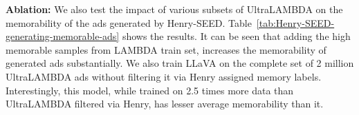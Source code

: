\textbf{Ablation:} We also test the impact of various subsets of UltraLAMBDA on the memorability of the ads generated by Henry-SEED. Table~\ref{tab:Henry-SEED-generating-memorable-ads} shows the results. It can be seen that adding the high memorable samples from LAMBDA train set, increases the memorability of generated ads substantially. We also train LLaVA on the complete set of 2 million UltraLAMBDA ads without filtering it via Henry assigned memory labels. Interestingly, this model, while trained on 2.5 times more data than UltraLAMBDA filtered via Henry, has lesser average memorability than it.




\begin{table}[!h]
    \caption{\textbf{Ad Generation}: Perplexity comparison (refer \S\ref{sec:Perplexity evaluation}) of LLaVA and Henry-SEED on low/medium/high memorable ads from LAMBDA test set. We see that untrained LLaVA does not favor memorable ads. Further, we note that when synthetic data is included during training, the ratio of perplexity on low and high ads grows from 2.79 to 3.01.}
    \label{table:perplexity-scores-ultralamda}
\end{table}

